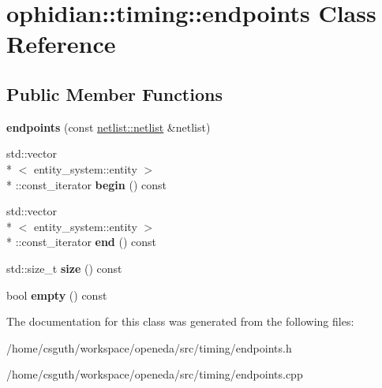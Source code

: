 \hypertarget{classophidian_1_1timing_1_1endpoints}{\section{ophidian\-:\-:timing\-:\-:endpoints Class Reference}
\label{classophidian_1_1timing_1_1endpoints}
}
\subsection*{Public Member Functions}
\begin{DoxyCompactItemize}
\item 
\hypertarget{classophidian_1_1timing_1_1endpoints_a62ced46f42aad54aeb384e7a963a3e56}{{\bfseries endpoints} (const \hyperlink{classophidian_1_1netlist_1_1netlist}{netlist\-::netlist} \&netlist)}\label{classophidian_1_1timing_1_1endpoints_a62ced46f42aad54aeb384e7a963a3e56}

\item 
\hypertarget{classophidian_1_1timing_1_1endpoints_ae75dc036190fdc98eeebbd624bdbb4f4}{std\-::vector\\*
$<$ entity\-\_\-system\-::entity $>$\\*
\-::const\-\_\-iterator {\bfseries begin} () const }\label{classophidian_1_1timing_1_1endpoints_ae75dc036190fdc98eeebbd624bdbb4f4}

\item 
\hypertarget{classophidian_1_1timing_1_1endpoints_aae6f4c67078f88f6699b459fb5ef10bd}{std\-::vector\\*
$<$ entity\-\_\-system\-::entity $>$\\*
\-::const\-\_\-iterator {\bfseries end} () const }\label{classophidian_1_1timing_1_1endpoints_aae6f4c67078f88f6699b459fb5ef10bd}

\item 
\hypertarget{classophidian_1_1timing_1_1endpoints_af743daa36f144a33837719b44767958a}{std\-::size\-\_\-t {\bfseries size} () const }\label{classophidian_1_1timing_1_1endpoints_af743daa36f144a33837719b44767958a}

\item 
\hypertarget{classophidian_1_1timing_1_1endpoints_a935ba04e18e780a70d3a11c8ad12e2c6}{bool {\bfseries empty} () const }\label{classophidian_1_1timing_1_1endpoints_a935ba04e18e780a70d3a11c8ad12e2c6}

\end{DoxyCompactItemize}


The documentation for this class was generated from the following files\-:\begin{DoxyCompactItemize}
\item 
/home/csguth/workspace/openeda/src/timing/endpoints.\-h\item 
/home/csguth/workspace/openeda/src/timing/endpoints.\-cpp\end{DoxyCompactItemize}
